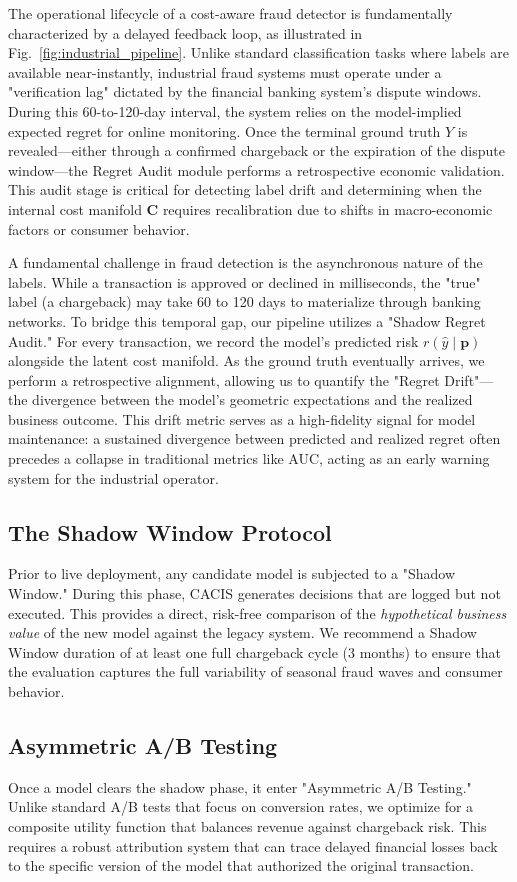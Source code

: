 \documentclass[sigconf,anonymous]{acmart}
\newcommand{\CACIS}{\textsc{CACIS}}
\newcommand{\vp}{\mathbf{p}}
\newcommand{\mC}{\mathbf{C}}
\begin{document}
The operational lifecycle of a cost-aware fraud detector is fundamentally characterized by a delayed feedback loop, as illustrated in Fig.~\ref{fig:industrial_pipeline}. Unlike standard classification tasks where labels are available near-instantly, industrial fraud systems must operate under a "verification lag" dictated by the financial banking system's dispute windows. During this 60-to-120-day interval, the system relies on the model-implied expected regret for online monitoring. Once the terminal ground truth $Y$ is revealed—either through a confirmed chargeback or the expiration of the dispute window—the Regret Audit module performs a retrospective economic validation. This audit stage is critical for detecting label drift and determining when the internal cost manifold $\mC$ requires recalibration due to shifts in macro-economic factors or consumer behavior.

A fundamental challenge in fraud detection is the asynchronous nature of the labels. While a transaction is approved or declined in milliseconds, the "true" label (a chargeback) may take 60 to 120 days to materialize through banking networks. To bridge this temporal gap, our pipeline utilizes a "Shadow Regret Audit." For every transaction, we record the model's predicted risk $r(\hat{y} \mid \vp)$ alongside the latent cost manifold. As the ground truth eventually arrives, we perform a retrospective alignment, allowing us to quantify the "Regret Drift"—the divergence between the model's geometric expectations and the realized business outcome. This drift metric serves as a high-fidelity signal for model maintenance: a sustained divergence between predicted and realized regret often precedes a collapse in traditional metrics like AUC, acting as an early warning system for the industrial operator.

\subsection{The Shadow Window Protocol}
Prior to live deployment, any candidate model is subjected to a "Shadow Window." During this phase, \CACIS{} generates decisions that are logged but not executed. This provides a direct, risk-free comparison of the \emph{hypothetical business value} of the new model against the legacy system. We recommend a Shadow Window duration of at least one full chargeback cycle (3 months) to ensure that the evaluation captures the full variability of seasonal fraud waves and consumer behavior.

\subsection{Asymmetric A/B Testing}
Once a model clears the shadow phase, it enter "Asymmetric A/B Testing." Unlike standard A/B tests that focus on conversion rates, we optimize for a composite utility function that balances revenue against chargeback risk. This requires a robust attribution system that can trace delayed financial losses back to the specific version of the model that authorized the original transaction.
\end{document}
